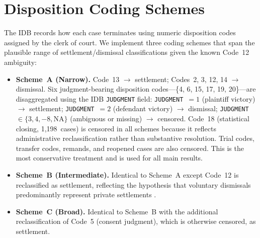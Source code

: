 \section{Disposition Coding Schemes}
\label{sec:coding_schemes}

The IDB records how each case terminates using numeric
disposition codes assigned by the clerk of court. We
implement three coding schemes that span the plausible
range of settlement/dismissal classifications given the
known Code~12 ambiguity:

\begin{itemize}
    \item \textbf{Scheme~A (Narrow).} Code~13 $\to$
    settlement; Codes~2, 3, 12, 14 $\to$ dismissal.
    Six judgment-bearing disposition codes---\{4, 6, 15, 17, 19, 20\}---are disaggregated using the IDB
    \texttt{JUDGMENT} field: \texttt{JUDGMENT}~$= 1$
    (plaintiff victory) $\to$ settlement;
    \texttt{JUDGMENT}~$= 2$ (defendant victory) $\to$
    dismissal; \texttt{JUDGMENT}~$\in \{3, 4, -8,
    \text{NA}\}$ (ambiguous or missing) $\to$ censored.
    Code~18 (statistical closing, 1,198~cases) is
    censored in all schemes because it reflects
    administrative reclassification rather than
    substantive resolution. Trial codes, transfer codes,
    remands, and reopened cases are also censored. This
    is the most conservative treatment and is used for
    all main results.

    \item \textbf{Scheme~B (Intermediate).} Identical to
    Scheme~A except Code~12 is reclassified as settlement,
    reflecting the hypothesis that voluntary dismissals
    predominantly represent private settlements
    \citep{scales2024}.

    \item \textbf{Scheme~C (Broad).} Identical to
    Scheme~B with the additional reclassification of
    Code~5 (consent judgment), which is otherwise censored,
    as settlement.
\end{itemize}

